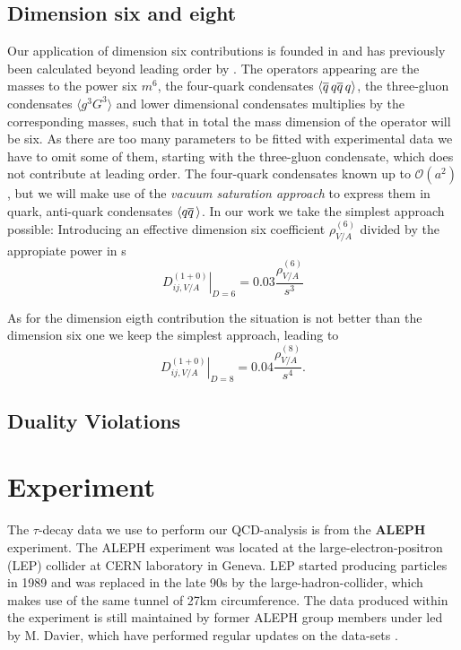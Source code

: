 \documentclass[../../index.tex]{subfiles}
\begin{document}
\subsection{Dimension six and eight}
Our application of dimension six contributions is founded in \cite{Braaten1991}
and has previously been calculated beyond leading order by \cite{Lanin1986}.
The operators appearing are the masses to the power six $m^6$, the four-quark
condensates $\langle \overline{q}\, q \overline{q}\, q \rangle$, the three-gluon condensates
$\langle g^3 G^3 \rangle$ and lower dimensional condensates multiplies by the
corresponding masses, such that in total the mass dimension of the operator will
be six.
As there are too many parameters to be fitted with experimental data we have to
omit some of them, starting with the three-gluon condensate, which does not
contribute at leading order. The four-quark condensates known up to
$\mathcal{O}(a^2)$, but we will make use of the \textit{vacuum saturation
  approach} \cite{Beneke2008,Braaten1991,Shifman1978} to express them in quark, anti-quark condensates $\langle q \overline{q}\, \rangle$.
In our work we take the simplest approach possible: Introducing an effective
dimension six coefficient $\rho_{V/A}^{(6)}$ divided by the appropiate power in s
\begin{equation}
  \left. D_{ij,V/A}^{(1+0)} \right\rvert_{D=6} = 0.03 \frac{\rho_{V/A}^{(6)}}{s^3}
\end{equation}

As for the dimension eigth contribution the situation is not better than the
dimension six one we keep the simplest approach, leading to
\begin{equation}
  \left. D_{ij,V/A}^{(1+0)} \right\rvert_{D=8} = 0.04 \frac{\rho_{V/A}^{(8)}}{s^4}.
\end{equation}


\subsection{Duality Violations}


\section{Experiment}
The $\tau$-decay data we use to perform our QCD-analysis is from the
\textbf{ALEPH} experiment. The ALEPH experiment was located at the
large-electron-positron (LEP) collider at CERN laboratory in Geneva. LEP started
producing particles in 1989 and was replaced in the late 90s by the
large-hadron-collider, which makes use of the same tunnel of 27km circumference.
The data produced within the experiment is still maintained by former ALEPH
group members under led by M. Davier, which have performed regular updates on
the data-sets \cite{Davier2013,Davier2008,Schael2005}.
\end{document}
